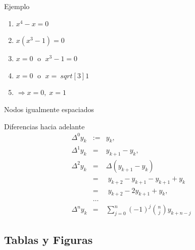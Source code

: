\documentclass[11pt,a4paper]{beamer}
\begin{document}
\begin{frame}{Ejemplo}
\begin{enumerate}
\item <1-> $x^4-x=0$
\item <2-> $x(x^3-1) =0$
\item <3-> $x =0 \;$ o $\;x^3 -1=0$
\item <4-> $x =0 \;$ o $\;x=\ sqrt [3]{1}$
\item <1-> $\Longrightarrow x=0,\; x=1$
\end{enumerate}
\end{frame}

\begin{frame}{ Nodos igualmente espaciados}
\begin{block}{ Diferencias hacia adelante}
\begin{eqnarray*}
\Delta^0 y_k&:=&y_k,\\
\Delta^1 y_k&=&y_{k+1}-y_k,\\
\Delta^2 y_k&=&\Delta(y_{k+1}-y_k)\; \\
&=&\;y_{k+2}-y_{k+1}-y_{k+1}+y_k\; \\
&=&\;y_{k+2}-2y_{k+1}+y_k,\\
&\dots &\\
\Delta^n y_k&=&\sum_{j=0}^{n}(-1)^j\binom{n}{j}y_{k+n-j}
\end{eqnarray*}
\end{block}
\end{frame}

 
 
\subsection{Tablas y Figuras} %
 
\end{document}
